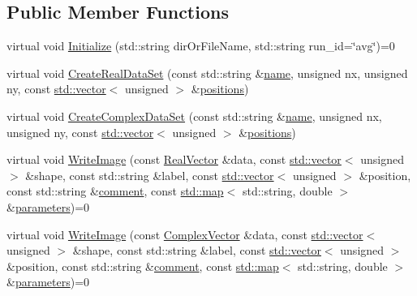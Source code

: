 \subsection*{Public Member Functions}
\begin{DoxyCompactItemize}
\item 
virtual void \hyperlink{class_q_s_t_e_m_1_1_i_data_writer_a0702c74c6a781a6caf64e6db349418a2}{Initialize} (std\-::string dir\-Or\-File\-Name, std\-::string run\-\_\-id=\char`\"{}avg\char`\"{})=0
\item 
virtual void \hyperlink{class_q_s_t_e_m_1_1_i_data_writer_ad7a8a0c754f4f2b4f6f27476dede21c5}{Create\-Real\-Data\-Set} (const std\-::string \&\hyperlink{qmb_8m_abdc1dcc6fed70c14f9b5ae237e486f4e}{name}, unsigned nx, unsigned ny, const \hyperlink{qmb_8m_af54b69a32590de218622e869b06b47b3}{std\-::vector}$<$ unsigned $>$ \&\hyperlink{qmb_8m_a923d61728dac7c6dff07427a901c9ba9}{positions})
\item 
virtual void \hyperlink{class_q_s_t_e_m_1_1_i_data_writer_a5fb2541f2f4292766992bf69915aa56e}{Create\-Complex\-Data\-Set} (const std\-::string \&\hyperlink{qmb_8m_abdc1dcc6fed70c14f9b5ae237e486f4e}{name}, unsigned nx, unsigned ny, const \hyperlink{qmb_8m_af54b69a32590de218622e869b06b47b3}{std\-::vector}$<$ unsigned $>$ \&\hyperlink{qmb_8m_a923d61728dac7c6dff07427a901c9ba9}{positions})
\item 
virtual void \hyperlink{class_q_s_t_e_m_1_1_i_data_writer_a62254b3a1ea8b92a6e6a0265be63a5a0}{Write\-Image} (const \hyperlink{namespace_q_s_t_e_m_a8dfe9e1dbecce3838cb082d96e991ba7}{Real\-Vector} \&data, const \hyperlink{qmb_8m_af54b69a32590de218622e869b06b47b3}{std\-::vector}$<$ unsigned $>$ \&shape, const std\-::string \&label, const \hyperlink{qmb_8m_af54b69a32590de218622e869b06b47b3}{std\-::vector}$<$ unsigned $>$ \&position, const std\-::string \&\hyperlink{image_sim_8m_aea4cc4bd8e43a7f8ebf9b0ee3da8d681}{comment}, const \hyperlink{_displacement_params_8m_af619c74fd72bdb64d115463dff2720cd}{std\-::map}$<$ std\-::string, double $>$ \&\hyperlink{sim_image_from_wave_8m_acb6d7970e73c00effe1d16e23142f11d}{parameters})=0
\item 
virtual void \hyperlink{class_q_s_t_e_m_1_1_i_data_writer_aaa289d6b48616890c620e99c3a003b1e}{Write\-Image} (const \hyperlink{namespace_q_s_t_e_m_af210a2c1f9afae1deed746dcd9276221}{Complex\-Vector} \&data, const \hyperlink{qmb_8m_af54b69a32590de218622e869b06b47b3}{std\-::vector}$<$ unsigned $>$ \&shape, const std\-::string \&label, const \hyperlink{qmb_8m_af54b69a32590de218622e869b06b47b3}{std\-::vector}$<$ unsigned $>$ \&position, const std\-::string \&\hyperlink{image_sim_8m_aea4cc4bd8e43a7f8ebf9b0ee3da8d681}{comment}, const \hyperlink{_displacement_params_8m_af619c74fd72bdb64d115463dff2720cd}{std\-::map}$<$ std\-::string, double $>$ \&\hyperlink{sim_image_from_wave_8m_acb6d7970e73c00effe1d16e23142f11d}{parameters})=0

\end{DoxyCompactItemize}
